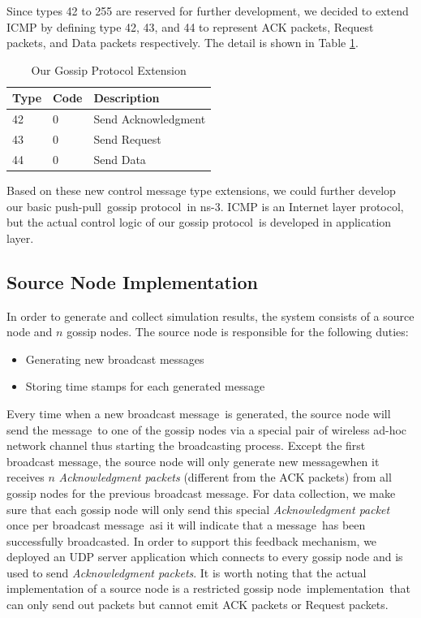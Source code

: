 \documentclass[onehalf,11pt]{beavtex}
\newcommand{\gp}{gossip protocol}
\newcommand{\msgs}{messages}
\newcommand{\msg}{message}
\newcommand{\pp}{push-pull}
\newcommand{\gn}{gossip node}
\newcommand{\im}{implementation}
\begin{document}
Since types 42 to 255 are reserved for further development, we decided to extend ICMP by defining type 42, 43, and 44 to represent ACK packets, Request packets, and Data packets respectively. The detail is shown in Table \ref{table:3}.

\begin{table}[h]
	\centering
	\caption{Our Gossip Protocol Extension}
	\label{table:3}
	\begin{tabular}{|p{0.8cm}|p{0.8 cm}|p{4.0 cm}|}
		\hline
		Type & Code & Description \\                                                           
		\hline
		42  & 0   & Send Acknowledgment   \\ \hline
		43  &  0 & Send Request \\ 
		\hline
		44 & 0 & Send Data \\
		\hline
	\end{tabular}
\end{table}

Based on these new control message type extensions, we could further develop our basic \pp  ~\gp ~in ns-3. ICMP is an Internet layer protocol, but the actual control logic of our \gp ~is developed in application layer. 

\subsection{Source Node Implementation}
In order to generate and collect simulation results, the system consists of a source node and $n$ gossip nodes. The source node is responsible for the following duties:

\begin{itemize}
	\item Generating new broadcast \msgs
	\item Storing time stamps for each generated \msg
\end{itemize}

Every time when a new broadcast \msg ~is generated, the source node will send the \msg ~to one of the gossip nodes via a special pair of wireless ad-hoc network channel thus starting the broadcasting process. Except the first broadcast \msg, the source node will only generate new \msg when it receives $n$ \emph{Acknowledgment packets} (different from the ACK packets) from all gossip nodes for the previous broadcast \msg. For data collection, we make sure that each gossip node will only send this special \emph{Acknowledgment packet} once per broadcast \msg ~asi it will indicate that a \msg ~has been successfully broadcasted. In order to support this feedback mechanism, we deployed an UDP server application which connects to every gossip node and is used to send \emph{Acknowledgment packets}. It is worth noting that the actual implementation of a source node is a restricted  \gn ~\im ~that can only send out packets but cannot emit ACK packets or Request packets. 
\end{document}
